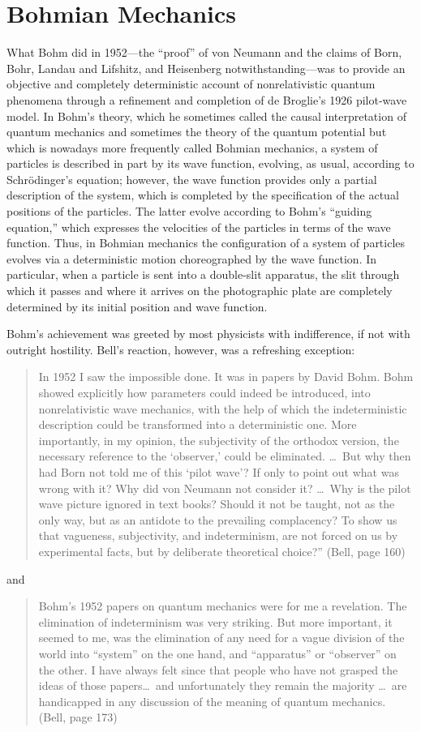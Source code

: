 \documentclass[12pt]{article}
\newcommand\bq{\begin{quotation}}
\newcommand\eq{\end{quotation}}
\begin{document}
\section{Bohmian Mechanics}

What Bohm did in 1952---the ``proof'' of von Neumann and the claims of
Born, Bohr, Landau and Lifshitz, and Heisenberg notwithstanding---was to
provide an objective and completely deterministic account of
nonrelativistic quantum phenomena through a refinement and completion of de
Broglie's 1926 pilot-wave model.  In Bohm's theory, which he sometimes called
the causal interpretation of quantum mechanics and sometimes the theory of
the quantum potential but which is nowadays more frequently called Bohmian
mechanics,  a system of particles is described in part by its wave
function, evolving, as usual, according to Schr\"odinger's equation;
however, the wave function provides only a partial description of the
system, which is completed by the specification of the actual positions of
the particles. The latter evolve according to Bohm's ``guiding equation,''
which expresses the velocities of the particles in terms of the wave
function.  Thus, in Bohmian mechanics the configuration of a system of
particles evolves via a deterministic motion choreographed by the wave
function. In particular, when a particle is sent into a double-slit
apparatus, the slit through which it passes and where it arrives on the
photographic plate are completely determined by its initial position and
wave function.

Bohm's achievement was greeted by most physicists with indifference, if not
with outright hostility.  Bell's reaction, however, was a refreshing exception:

\bq\noindent In 1952 I saw the impossible done.  It was in papers by David
Bohm. Bohm showed explicitly how parameters could indeed be introduced,
into nonrelativistic wave mechanics, with the help of which the
indeterministic description could be transformed into a deterministic one.
More importantly, in my opinion, the subjectivity of the orthodox version,
the necessary reference to the `observer,' could be eliminated.  \dots\  But
why then had Born not told me of this `pilot wave'?  If only to point out
what was wrong with it? Why did von Neumann not consider it? \dots\  Why is the
pilot wave picture ignored in text books?  Should it not be taught, not as
the only way, but as an antidote to the prevailing complacency? To show us
that vagueness, subjectivity, and indeterminism, are not forced on us by
experimental facts, but by deliberate theoretical choice?'' (Bell, page
160)
\eq
and
\bq\noindent Bohm's 1952 papers on quantum mechanics were for me a
revelation. The elimination of indeterminism was very striking. But more
important, it seemed to me, was the elimination of any need for a vague
division of the world into ``system'' on the one hand, and ``apparatus'' or
``observer'' on the other. I have always felt since that people who have
not grasped the ideas of those papers\dots\  and unfortunately they remain the
majority \dots\  are handicapped in any discussion of the meaning of quantum
mechanics. (Bell, page 173)
\eq
\end{document}
